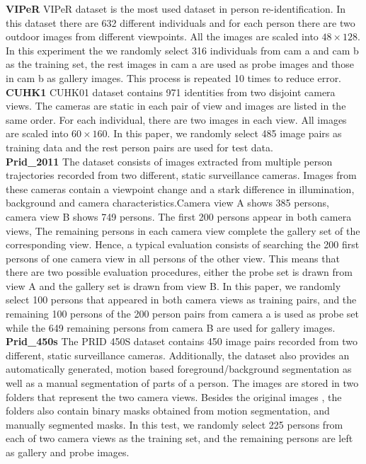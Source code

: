 \documentclass[conference,compsoc]{IEEEtran}
\begin{document}
\noindent \textbf{VIPeR} VIPeR dataset is the most used dataset in person re-identification. In this dataset there are 632 different individuals and for each person there are two outdoor images from different viewpoints. All the images are scaled into $48\times128$. In this experiment the we randomly select 316 individuals from cam a and cam b as the training set, the rest images in cam a are used as probe images and those in cam b as gallery images. This process is repeated 10 times to reduce error.\\
\textbf{CUHK1} CUHK01 dataset contains 971 identities from two disjoint camera views. The cameras are static in each pair of view and images are listed in the same order. For each individual, there are two images in each view. All images are scaled into $60\times160$. In this paper, we randomly select 485 image pairs as training data and the rest person pairs are used for test data. \\
\textbf{Prid\_2011} The dataset consists of images extracted from multiple person trajectories recorded from two different, static surveillance cameras. Images from these cameras contain a viewpoint change and a stark difference in illumination, background and camera characteristics.Camera view A shows 385 persons, camera view B shows 749 persons. The first 200 persons appear in both camera views, The remaining persons in each camera view complete the gallery set of the corresponding view. Hence, a typical evaluation consists of searching the 200 first persons of one camera view in all persons of the other view. This means that there are two possible evaluation procedures, either the probe set is drawn from view A and the gallery set is drawn from view B. In this paper, we randomly select 100 persons that appeared in both camera views as training pairs, and the remaining 100 persons of the 200 person pairs from camera a is used as probe set while the 649 remaining persons from camera B are used for gallery images. \\
\textbf{Prid\_450s} The PRID 450S dataset contains 450 image pairs recorded from two different, static surveillance cameras. Additionally, the dataset also provides an automatically generated, motion based foreground/background segmentation as well as a manual segmentation of parts of a person. The images are stored in two folders that represent the two camera views. Besides the original images , the folders also contain binary masks obtained from motion segmentation, and manually segmented masks. In this test, we randomly select 225 persons from each of two camera views as the training set, and the remaining persons are left as gallery and probe images. \\
\end{document}
